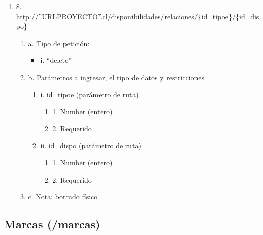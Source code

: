 \begin{enumerate}
    \item 8. http://”URLPROYECTO”.cl/disponibilidades/relaciones/\{id\_tipoe\}/\{id\_dispo\}
    \begin{enumerate}
        \item a. Tipo de petición:
            \begin{itemize}
               \item i. “delete”
            \end{itemize}
        \item b. Parámetros a ingresar, el tipo de datos y restricciones
            \begin{enumerate}
                \item i. id\_tipoe (parámetro de ruta)
                    \begin{enumerate}
                        \item 1. Number (entero)
                        \item 2. Requerido
                    \end{enumerate}
                \item ii. id\_dispo (parámetro de ruta)
                    \begin{enumerate}
                        \item 1. Number (entero)
                        \item 2. Requerido
                    \end{enumerate}
            \end{enumerate}
        \item c. Nota: borrado físico
    \end{enumerate}
\end{enumerate}

\subsection{Marcas (/marcas)}

